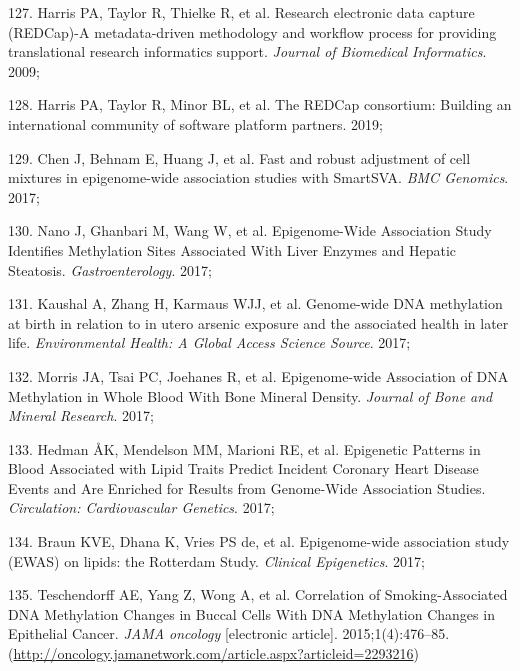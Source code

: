 \documentclass[11pt,oneside]{bristolthesis}
\newenvironment{cslreferences}%
  {}%
  {\par}
\begin{document}
\begin{cslreferences}
\leavevmode\hypertarget{ref-Harris2009}{}%
127. Harris PA, Taylor R, Thielke R, et al. Research electronic data capture (REDCap)-A metadata-driven methodology and workflow process for providing translational research informatics support. \emph{Journal of Biomedical Informatics}. 2009;

\leavevmode\hypertarget{ref-Harris2019}{}%
128. Harris PA, Taylor R, Minor BL, et al. The REDCap consortium: Building an international community of software platform partners. 2019;

\leavevmode\hypertarget{ref-Chen2017}{}%
129. Chen J, Behnam E, Huang J, et al. Fast and robust adjustment of cell mixtures in epigenome-wide association studies with SmartSVA. \emph{BMC Genomics}. 2017;

\leavevmode\hypertarget{ref-Nano2017}{}%
130. Nano J, Ghanbari M, Wang W, et al. Epigenome-Wide Association Study Identifies Methylation Sites Associated With Liver Enzymes and Hepatic Steatosis. \emph{Gastroenterology}. 2017;

\leavevmode\hypertarget{ref-Kaushal2017}{}%
131. Kaushal A, Zhang H, Karmaus WJJ, et al. Genome-wide DNA methylation at birth in relation to in utero arsenic exposure and the associated health in later life. \emph{Environmental Health: A Global Access Science Source}. 2017;

\leavevmode\hypertarget{ref-Morris2017}{}%
132. Morris JA, Tsai PC, Joehanes R, et al. Epigenome-wide Association of DNA Methylation in Whole Blood With Bone Mineral Density. \emph{Journal of Bone and Mineral Research}. 2017;

\leavevmode\hypertarget{ref-Hedman2017}{}%
133. Hedman ÅK, Mendelson MM, Marioni RE, et al. Epigenetic Patterns in Blood Associated with Lipid Traits Predict Incident Coronary Heart Disease Events and Are Enriched for Results from Genome-Wide Association Studies. \emph{Circulation: Cardiovascular Genetics}. 2017;

\leavevmode\hypertarget{ref-Braun2017}{}%
134. Braun KVE, Dhana K, Vries PS de, et al. Epigenome-wide association study (EWAS) on lipids: the Rotterdam Study. \emph{Clinical Epigenetics}. 2017;

\leavevmode\hypertarget{ref-Teschendorff2015}{}%
135. Teschendorff AE, Yang Z, Wong A, et al. Correlation of Smoking-Associated DNA Methylation Changes in Buccal Cells With DNA Methylation Changes in Epithelial Cancer. \emph{JAMA oncology} {[}electronic article{]}. 2015;1(4):476--85. (\url{http://oncology.jamanetwork.com/article.aspx?articleid=2293216})


\end{cslreferences}
\end{document}

